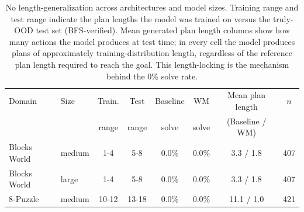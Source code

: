 \begin{table}[t]
\centering
\caption{No length-generalization across architectures and model sizes. Training range and test range indicate the plan lengths the model was trained on versus the truly-OOD test set (BFS-verified). Mean generated plan length columns show how many actions the model produces at test time; in every cell the model produces plans of approximately training-distribution length, regardless of the reference plan length required to reach the goal. This length-locking is the mechanism behind the 0\% solve rate.}
\label{tab:truly-ood}
\begin{tabular}{llcccccc}
\toprule
Domain & Size & Train. & Test & Baseline & WM & Mean plan length & $n$ \\
       &      & range  & range & solve   & solve & (Baseline / WM)  &       \\
\midrule
Blocks World & medium & 1-4 & 5-8 & 0.0\% & 0.0\% & 3.3 / 1.8 & 407 \\
Blocks World & large & 1-4 & 5-8 & 0.0\% & 0.0\% & 3.3 / 1.8 & 407 \\
8-Puzzle & medium & 10-12 & 13-18 & 0.0\% & 0.0\% & 11.1 / 1.0 & 421 \\
\bottomrule
\end{tabular}
\end{table}
